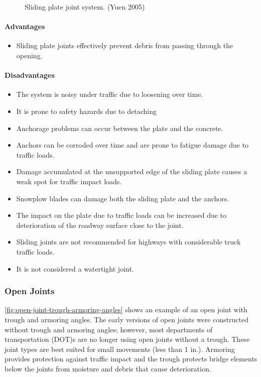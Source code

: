 \begin{figure}
  \caption{Sliding plate joint system. (Yuen 2005)}
  \label{fig:sliding-plate-joint-system}
\end{figure}

\paragraph{Advantages}
\begin{itemize}
  \item Sliding plate joints effectively prevent debris from passing through the opening.
\end{itemize}
\paragraph{Disadvantages}
\begin{itemize}
  \item The system is noisy under traffic due to loosening over time.
  \item It is prone to safety hazards due to detaching
  \item  Anchorage problems can occur between the plate and the concrete.
  \item  Anchors can be corroded over time and are prone to fatigue damage due to traffic loads.
  \item Damage accumulated at the unsupported edge of the sliding plate causes a weak spot for traffic impact loads.
  \item  Snowplow blades can damage both the sliding plate and the anchors.
  \item The impact on the plate due to traffic loads can be increased due to deterioration of the roadway surface close
  to the joint.
  \item Sliding joints are not recommended for highways with considerable truck traffic loads.
  \item  It is not considered a watertight joint.
\end{itemize}

\subsubsection{Open Joints}
\cref{fig:open-joint-trough-armoring-angles} shows an example of an open joint with trough and armoring angles. The early versions of open joints
were constructed without trough and armoring angles; however, most departments of transportation (DOT)s are no
longer using open joints without a trough. These joint types are best suited for small movements (less than 1 in.).
Armoring provides protection against traffic impact and the trough protects bridge elements below the joints from
moisture and debris that cause deterioration.

